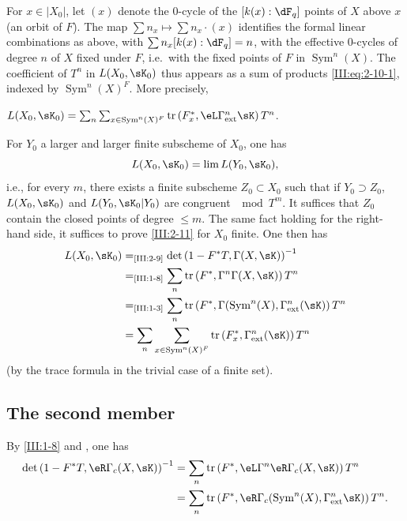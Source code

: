 For $x\in |X_0|$, let $(x)$ denote the $0$-cycle of the $[k(x):\dF_q]$ points of $X$
above $x$ (an orbit of $F$). The map
$\sum n_x\mapsto \sum n_x\cdot (x)$ identifies the formal linear
combinations as above, with $\sum n_x [k(x):\dF_q]=n$, with the effective
$0$-cycles of degree $n$ of $X$ fixed under $F$, i.e.\ with the fixed points of
$F$ in $\operatorname{Sym}^n(X)$. The coefficient of $T^n$ in $L(X_0,\sK_0)$
thus appears as a sum of products \eqref{III:eq:2-10-1}, indexed
by $\operatorname{Sym}^n(X)^F$. More precisely,




\begin{lemma_}\label{III:2-11}
 $L(X_0,\sK_0) = \sum_n \sum_{x\in\operatorname{Sym}^n(X)^F} \tr\left(F_x^*,\eL\Gamma_\textnormal{ext}^n \sK\right) T^n$.
\end{lemma_}

For $Y_0$ a larger and larger finite subscheme of $X_0$, one has
\[
  L(X_0,\sK_0) = \lim L(Y_0,\sK_0) \text{,}
\]
i.e., for every $m$, there exists a finite subscheme $Z_0\subset X_0$ such that
if $Y_0\supset Z_0$, $L(X_0,\sK_0)$ and $L(Y_0,\sK_0|Y_0)$ are congruent
$\mod T^m$.
It suffices that $Z_0$ contain the closed points of degree $\leqslant m$.
The same fact holding for the right-hand side, it suffices to prove
\ref{III:2-11} for $X_0$ finite. One then has
\begin{align*}
  L(X_0,\sK_0)
    &=_\text{\ref{III:2-9}} \det\left(1-F^* T,\Gamma(X,\sK)\right)^{-1} \\
    &=_\text{\ref{III:1-8}} \sum_n \tr\left(F^*,\Gamma^n \Gamma(X,\sK)\right) T^n \\
    &=_\text{\ref{III:1-3}} \sum_n \tr\left(F^*,\Gamma(\operatorname{Sym}^n(X),\Gamma_\text{ext}^n(\sK)\right) T^n \\
    &= \sum_n \sum_{x\in \operatorname{Sym}^n(X)^F} \tr\left(F_x^*,\Gamma_\text{ext}^n(\sK)\right) T^n
\end{align*}
(by the trace formula in the trivial case of a finite set).




\subsection{The second member}\label{III:2-12}

By \ref{III:1-8} and \cite[XVII 5.5.12]{sga4}, one has
\begin{align*}
  \det\left(1-F^* T,\eR\Gamma_c(X,\sK)\right)^{-1}
    &= \sum_n \tr\left(F^*,\eL\Gamma^n\eR\Gamma_c(X,\sK)\right) T^n \\
    &= \sum_n \tr\left(F^*,\eR\Gamma_c(\operatorname{Sym}^n(X),\Gamma_\text{ext}^n\sK)\right) T^n \text{.}
\end{align*}




